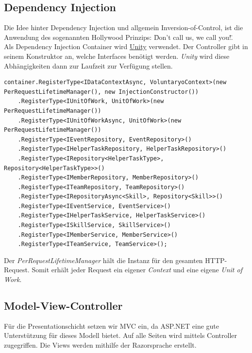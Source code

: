 	\subsection{Dependency Injection}
	Die Idee hinter Dependency Injection und allgemein Inversion-of-Control, ist die Anwendung des sogenannten Hollywood Prinzips: \"Don’t call us, we call you!\". 
	\\Als Dependency Injection Container wird \href{http://unity.codeplex.com/}{Unity} verwendet. Der Controller gibt in seinem Konstruktor an, welche Interfaces benötigt werden. \textit{Unity} wird diese Abhängigkeiten dann zur Laufzeit zur Verfügung stellen.
	\begin{lstlisting}[language=CSharp, caption=UnityConfig.cs, label=lst:unityconfig, firstnumber=1]
container.RegisterType<IDataContextAsync, VoluntaryoContext>(new PerRequestLifetimeManager(), new InjectionConstructor())
    .RegisterType<IUnitOfWork, UnitOfWork>(new PerRequestLifetimeManager())
    .RegisterType<IUnitOfWorkAsync, UnitOfWork>(new PerRequestLifetimeManager())
    .RegisterType<IEventRepository, EventRepository>()
    .RegisterType<IHelperTaskRepository, HelperTaskRepository>()
    .RegisterType<IRepository<HelperTaskType>, Repository<HelperTaskType>>()
    .RegisterType<IMemberRepository, MemberRepository>()
    .RegisterType<ITeamRepository, TeamRepository>()
    .RegisterType<IRepositoryAsync<Skill>, Repository<Skill>>()
    .RegisterType<IEventService, EventService>()
    .RegisterType<IHelperTaskService, HelperTaskService>()
    .RegisterType<ISkillService, SkillService>()
    .RegisterType<IMemberService, MemberService>()
    .RegisterType<ITeamService, TeamService>();
    \end{lstlisting}
    Der \textit{PerRequestLifetimeManager} hält die Instanz für den gesamten HTTP-Request. Somit erhält jeder Request ein eigener \textit{Context} und eine eigene \textit{Unit of Work}.

	\subsection{Model-View-Controller}
	Für die Presentationschicht setzen wir MVC ein, da ASP.NET eine gute Unterstützung für dieses Modell bietet. Auf alle Seiten wird mittels Controller zugegriffen. Die Views werden mithilfe der Razorsprache erstellt.

